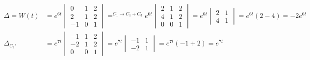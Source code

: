 \documentclass{article}
\DeclareMathOperator*{\equals}{=}
\begin{document}
\begin{align*}
    \Delta=W(t)                       & =e^{6t}\begin{vmatrix}
                                                   0  & 1 & 2 \\
                                                   2  & 1 & 2 \\
                                                   -1 & 0 & 1
                                               \end{vmatrix}\equals^{C_1\rightarrow C_1+C_3}e^{6t}\begin{vmatrix}
                                                                                                      2 & 1 & 2 \\
                                                                                                      4 & 1 & 2 \\
                                                                                                      0 & 0 & 1
                                                                                                  \end{vmatrix}=e^{6t}\begin{vmatrix}
                                                                                                                          2 & 1 \\
                                                                                                                          4 & 1
                                                                                                                      \end{vmatrix}=e^{6t}(2-4)=-2e^{6t}                                \\
    \Delta_{C_1'}                     & =e^{7t}\begin{vmatrix}
                                                   -1 & 1 & 2 \\
                                                   -2 & 1 & 2 \\
                                                   0  & 0 & 1
                                               \end{vmatrix}=e^{7t}\begin{vmatrix}
                                                                       -1 & 1 \\
                                                                       -2 & 1
                                                                   \end{vmatrix}=e^{7t}(-1+2)=e^{7t}                                                                                    \\

\end{align*}
\end{document}
